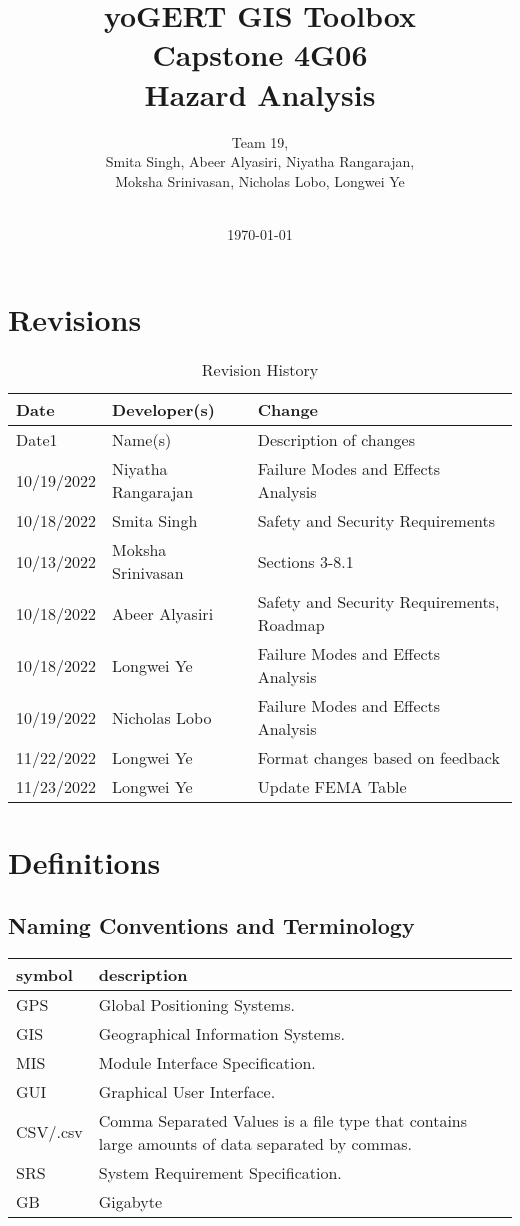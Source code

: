 \documentclass{article}
\title{\textbf{yoGERT GIS Toolbox}\\ Capstone 4G06\\ Hazard Analysis}
\author{Team 19,
		\\ Smita Singh, Abeer Alyasiri, Niyatha Rangarajan,\\ Moksha Srinivasan, Nicholas Lobo, Longwei Ye \\\\
}
\date{\today}
\begin{document}
\nocite{*}
\maketitle

\newpage

\tableofcontents
\listoftables
\listoffigures

\section{Revisions}

\begin{table}[hp]
\caption{Revision History} \label{TblRevisionHistory}
\begin{tabularx}{\textwidth}{llX}
\toprule
\textbf{Date} & \textbf{Developer(s)} & \textbf{Change}\\
\midrule
Date1 & Name(s) & Description of changes\\
10/19/2022 & Niyatha Rangarajan & Failure Modes and Effects Analysis\\
10/18/2022 & Smita Singh & Safety and Security Requirements\\
10/13/2022 & Moksha Srinivasan & Sections 3-8.1\\
10/18/2022 & Abeer Alyasiri & Safety and Security Requirements, Roadmap\\
10/18/2022 & Longwei Ye & Failure Modes and Effects Analysis\\
10/19/2022 & Nicholas Lobo & Failure Modes and Effects Analysis\\
11/22/2022 & Longwei Ye & Format changes based on feedback\\
11/23/2022 & Longwei Ye & Update FEMA Table\\
\bottomrule
\end{tabularx}
\end{table}

\section{Definitions}
\subsection{Naming Conventions and Terminology}
\begin{tabular}{l p{6cm}} 
  \toprule		
  \textbf{symbol} & \textbf{description}\\
  \midrule 
  GPS & Global Positioning Systems.\\
  GIS & Geographical Information Systems.\\
  MIS & Module Interface Specification.\\
  GUI & Graphical User Interface. \\
  CSV/.csv & Comma Separated Values is a file type that contains large amounts of data separated by commas.\\
  SRS & System Requirement Specification.\\
  GB & Gigabyte \\

  \bottomrule
\end{tabular}\\
\end{document}

